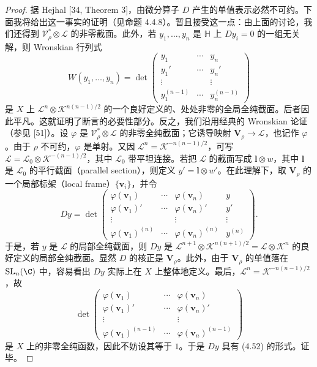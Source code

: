 \begin{proof}
据 Hejhal [34, Theorem 3]，由微分算子 $D$ 产生的单值表示必然不可约。下面我将给出这一事实的证明（见命题 4.4.8）。暂且接受这一点：由上面的讨论，我们还得到 $\mathcal{V}^*_\rho\otimes\mathcal{L}$ 的非零截面。此外，若 $y_1,\dots,y_n$ 是 $\mathbb{H}$ 上 $Dy_i=0$ 的一组无关解，则 Wronskian 行列式
\[
W(y_1,\dots,y_n)=\det
\begin{pmatrix}
y_1 & \cdots & y_n\\
y_1' & \cdots & y_n'\\
\vdots & & \vdots\\
y_1^{(n-1)} & \cdots & y_n^{(n-1)}
\end{pmatrix}
\]
是 $X$ 上 $\mathcal{L}^n\otimes\mathcal{K}^{n(n-1)/2}$ 的一个良好定义的、处处非零的全局全纯截面。后者因此平凡。这就证明了断言的必要性部分。反之，我们沿用经典的 Wronskian 论证（参见 [51]）。设 $\varphi$ 是 $\mathcal{V}^*_\rho\otimes\mathcal{L}$ 的非零全纯截面；它诱导映射 $\mathbf{V}_\rho\to\mathcal{L}$，也记作 $\varphi$。由于 $\rho$ 不可约，$\varphi$ 是单射。又因 $\mathcal{L}^n=\mathcal{K}^{-n(n-1)/2}$，可写 $\mathcal{L}=\mathcal{L}_0\otimes\mathcal{K}^{-(n-1)/2}$，其中 $\mathcal{L}_0$ 带平坦连接。若把 $\mathcal{L}$ 的截面写成 $\mathbf{l}\otimes w$，其中 $\mathbf{l}$ 是 $\mathcal{L}_0$ 的平行截面（parallel section），则定义 $y'=\mathbf{l}\otimes w'$。在此理解下，取 $\mathbf{V}_\rho$ 的一个局部标架（local frame）$\{\mathbf{v}_i\}$，并令
\[
Dy=\det
\begin{pmatrix}
\varphi(\mathbf{v}_1) & \cdots & \varphi(\mathbf{v}_n) & y\\
\varphi(\mathbf{v}_1)' & \cdots & \varphi(\mathbf{v}_n)' & y'\\
\vdots & & \vdots & \vdots\\
\varphi(\mathbf{v}_1)^{(n)} & \cdots & \varphi(\mathbf{v}_n)^{(n)} & y^{(n)}
\end{pmatrix}.
\]
于是，若 $y$ 是 $\mathcal{L}$ 的局部全纯截面，则 $Dy$ 是 $\mathcal{L}^{n+1}\otimes\mathcal{K}^{n(n+1)/2}=\mathcal{L}\otimes\mathcal{K}^n$ 的良好定义的局部全纯截面。显然 $D$ 的核正是 $\mathbf{V}_\rho$。此外，由于 $\mathbf{V}_\rho$ 的单值落在 $\mathrm{SL}_n(\C)$ 中，容易看出 $Dy$ 实际上在 $X$ 上整体地定义。最后，$\mathcal{L}^n=\mathcal{K}^{-n(n-1)/2}$，故
\[
\det
\begin{pmatrix}
\varphi(\mathbf{v}_1) & \cdots & \varphi(\mathbf{v}_n)\\
\varphi(\mathbf{v}_1)' & \cdots & \varphi(\mathbf{v}_n)'\\
\vdots & & \vdots\\
\varphi(\mathbf{v}_1)^{(n-1)} & \cdots & \varphi(\mathbf{v}_n)^{(n-1)}
\end{pmatrix}
\]
是 $X$ 上的非零全纯函数，因此不妨设其等于 $1$。于是 $Dy$ 具有 (4.52) 的形式。证毕。
\end{proof}

